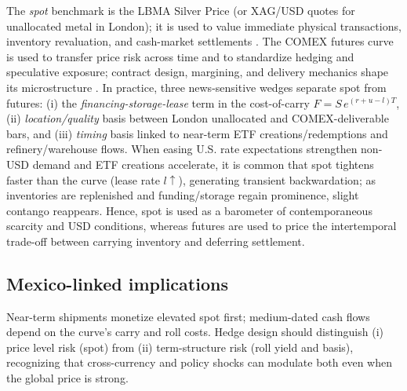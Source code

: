 \documentclass[11pt,a4paper]{article} %
\begin{document}
The \emph{spot} benchmark is the LBMA Silver Price (or XAG/USD quotes for unallocated metal in London); it is used to value immediate physical transactions, inventory revaluation, and cash-market settlements \citep{lbma_prices}. The COMEX futures curve is used to transfer price risk across time and to standardize hedging and speculative exposure; contract design, margining, and delivery mechanics shape its microstructure \citep{cme_silver_overview}. In practice, three news-sensitive wedges separate spot from futures: (i) the \emph{financing-storage-lease} term in the cost-of-carry \(F=S\,e^{(r+u-l)T}\), (ii) \emph{location/quality} basis between London unallocated and COMEX-deliverable bars, and (iii) \emph{timing} basis linked to near-term ETF creations/redemptions and refinery/warehouse flows. When easing U.S. rate expectations strengthen non-USD demand and ETF creations accelerate, it is common that spot tightens faster than the curve (lease rate \(l\uparrow\)), generating transient backwardation; as inventories are replenished and funding/storage regain prominence, slight contango reappears. Hence, spot is used as a barometer of contemporaneous scarcity and USD conditions, whereas futures are used to price the intertemporal trade-off between carrying inventory and deferring settlement.

\subsection{Mexico-linked implications}
Near-term shipments monetize elevated spot first; medium-dated cash flows depend on the curve's carry and roll costs. Hedge design should distinguish (i) price level risk (spot) from (ii) term-structure risk (roll yield and basis), recognizing that cross-currency and policy shocks can modulate both even when the global price is strong.
\end{document}
